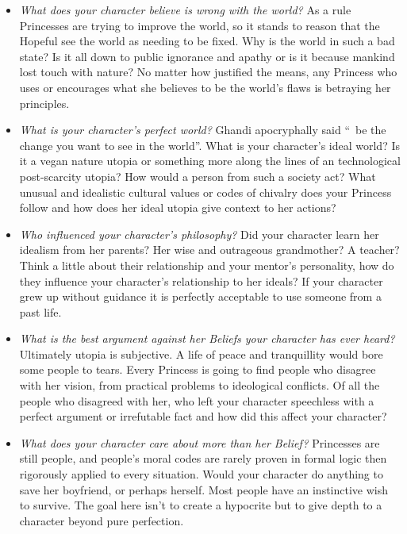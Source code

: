 \begin{itemize}
 \item \emph{What does your character believe is wrong with the world?} As a rule Princesses are trying to improve the world, so it stands to reason that the Hopeful see the world as needing to be fixed. Why is the world in such a bad state? Is it all down to public ignorance and apathy or is it because mankind lost touch with nature? No matter how justified the means, any Princess who uses or encourages what she believes to be the world's flaws is betraying her principles. 
 \item \emph{What is your character's perfect world?} Ghandi apocryphally said \textquotedblleft\, be the change you want to see in the world\textquotedblright . What is your character's ideal world? Is it a vegan nature utopia or something more along the lines of an technological post-scarcity utopia? How would a person from such a society act? What unusual and idealistic cultural values or codes of chivalry does your Princess follow and how does her ideal utopia give context to her actions?
 \item \emph{Who influenced your character's philosophy?} Did your character learn her idealism from her parents? Her wise and outrageous grandmother? A teacher? Think a little about their relationship and your mentor's personality, how do they influence your character's relationship to her ideals? If your character grew up without guidance it is perfectly acceptable to use someone from a past life. 
 \item \emph{What is the best argument against her Beliefs your character has ever heard?} Ultimately utopia is subjective. A life of peace and tranquillity would bore some people to tears. Every Princess is going to find people who disagree with her vision, from practical problems to ideological conflicts. Of all the people who disagreed with her, who left your character speechless with a perfect argument or irrefutable fact and how did this affect your character?
 \item \emph{What does your character care about more than her Belief?} Princesses are still people, and people's moral codes are rarely proven in formal logic then rigorously applied to every situation. Would your character do anything to save her boyfriend, or perhaps herself. Most people have an instinctive wish to survive. The goal here isn't to create a hypocrite but to give depth to a character beyond pure perfection. 
\end{itemize}

